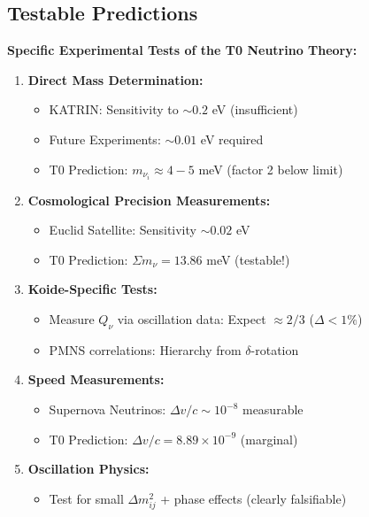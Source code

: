 	\subsection{Testable Predictions}
	
	\begin{experimental}
		\textbf{Specific Experimental Tests of the T0 Neutrino Theory:}
		
		\begin{enumerate}
			\item \textbf{Direct Mass Determination:}
			\begin{itemize}
				\item KATRIN: Sensitivity to $\sim 0.2$ eV (insufficient)
				\item Future Experiments: $\sim 0.01$ eV required
				\item T0 Prediction: $m_{\nu_i} \approx 4-5$ meV (factor 2 below limit)
			\end{itemize}
			
			\item \textbf{Cosmological Precision Measurements:}
			\begin{itemize}
				\item Euclid Satellite: Sensitivity $\sim 0.02$ eV
				\item T0 Prediction: $\Sigma m_\nu = 13.86$ meV (testable!)
			\end{itemize}
			
			\item \textbf{Koide-Specific Tests:}
			\begin{itemize}
				\item Measure $Q_\nu$ via oscillation data: Expect $\approx 2/3$ ($\Delta <1\%$)
				\item PMNS correlations: Hierarchy from $\delta$-rotation
			\end{itemize}
			
			\item \textbf{Speed Measurements:}
			\begin{itemize}
				\item Supernova Neutrinos: $\Delta v/c \sim 10^{-8}$ measurable
				\item T0 Prediction: $\Delta v/c = 8.89 \times 10^{-9}$ (marginal)
			\end{itemize}
			
			\item \textbf{Oscillation Physics:}
			\begin{itemize}
				\item Test for small $\Delta m^2_{ij}$ + phase effects (clearly falsifiable)
			\end{itemize}
		\end{enumerate}
	\end{experimental}
	
